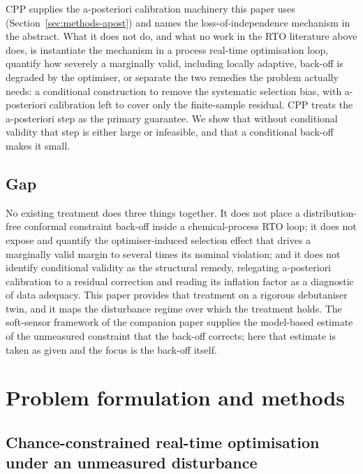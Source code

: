 \documentclass[review,times]{elsarticle}
\begin{document}
CPP supplies the a-posteriori calibration machinery this paper uses
(Section~\ref{sec:methods-apost}) and names the loss-of-independence mechanism in the
abstract. What it does not do, and what no work in the RTO literature above does, is
instantiate the mechanism in a process real-time optimisation loop, quantify how severely a
marginally valid, including locally adaptive, back-off is degraded by the optimiser, or
separate the two remedies the problem actually needs: a conditional construction to remove
the systematic selection bias, with a-posteriori calibration left to cover only the
finite-sample residual. CPP treats the a-posteriori step as the primary guarantee. We show
that without conditional validity that step is either large or infeasible, and that a
conditional back-off makes it small.

\subsection{Gap}

No existing treatment does three things together. It does not place a distribution-free
conformal constraint back-off inside a chemical-process RTO loop; it does not expose and
quantify the optimiser-induced selection effect that drives a marginally valid margin to
several times its nominal violation; and it does not identify conditional validity as the
structural remedy, relegating a-posteriori calibration to a residual correction and reading
its inflation factor as a diagnostic of data adequacy. This paper provides that treatment on
a rigorous debutaniser twin, and it maps the disturbance regime over which the treatment
holds. The soft-sensor framework of the companion paper \citep{companion2026} supplies the
model-based estimate of the unmeasured constraint that the back-off corrects; here that
estimate is taken as given and the focus is the back-off itself.

\section{Problem formulation and methods}
\label{sec:methods}

\subsection{Chance-constrained real-time optimisation under an unmeasured disturbance}
\label{sec:methods-rto}
\end{document}
